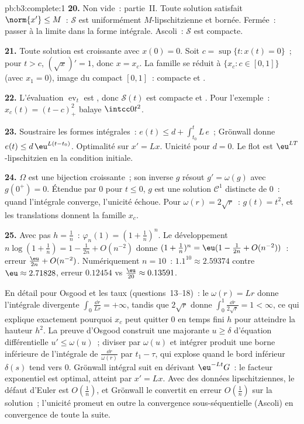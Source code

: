\begin{solution}{pb:b3:complete:1}
\textbf{20.} Non vide~: partie~II. Toute solution satisfait
$\norm{x'} \leq M$~: $\mathcal S$ est uniformément
$M$-lipschitzienne et bornée. Fermée~: passer à la limite
dans la forme intégrale. Ascoli~: $\mathcal S$ est compacte.

\textbf{21.} Toute solution est croissante avec $x(0) = 0$.
Soit $c = \sup\{t : x(t) = 0\}$~; pour $t > c$, $(\sqrt x)' =
1$, donc $x = x_c$. La famille se réduit à $\{x_c : c \in
[0,1]\}$ (avec $x_1 = 0$), image  du compact 
$[0,1]$~: compacte et .

\textbf{22.} L'évaluation $\operatorname{ev}_t$ est ,
donc $\mathcal S(t)$ est compacte et . Pour
l'exemple~: $x_c(t) = (t - c)_+^2$ balaye $\intcc0{t^2}$.

\textbf{23.} Soustraire les formes intégrales~: $e(t) \leq d
+ \int_{t_0}^t L\,e$~; Grönwall donne $e(t) \leq
d\,\eu^{L(t-t_0)}$. Optimalité sur $x' = Lx$. Unicité pour $d
= 0$. Le flot est $\eu^{LT}$-lipschitzien en la condition
initiale.

\textbf{24.} $\Omega$ est une bijection croissante~; son
inverse $g$ résout $g' = \omega(g)$ avec $g(0^+) = 0$.
Étendue par $0$ pour $t \leq 0$, $g$ est une solution
$\mathcal C^1$ distincte de $0$~: quand l'intégrale
converge, l'unicité échoue. Pour $\omega(r) = 2\sqrt r$~:
$g(t) = t^2$, et les translations donnent la famille $x_c$.

\textbf{25.} Avec pas $h = \frac1n$~: $\varphi_n(1) = (1 +
\frac1n)^n$. Le développement $n\log(1+\frac1n) = 1 -
\frac1{2n} + O(n^{-2})$ donne $(1+\frac1n)^n =
\eu(1-\frac1{2n}+O(n^{-2}))$~: erreur $\frac{\eu}{2n} +
O(n^{-2})$. Numériquement $n = 10$~: $1.1^{10} \approx
2.59374$ contre $\eu \approx 2.71828$, erreur $0.12454$ vs
$\frac{\eu}{20} \approx 0.13591$.


En détail pour Osgood et les taux (questions~13--18)~: le
 $\omega(r) = Lr$ donne l'intégrale divergente
$\int_0\frac{\dd r}{Lr} = +\infty$, tandis que $2\sqrt r$
donne $\int_0^1\frac{\dd r}{2\sqrt r} = 1 < \infty$, ce qui
explique exactement pourquoi $x_c$ peut quitter $0$ en temps
fini $h$ pour atteindre la hauteur $h^2$. La preuve d'Osgood
construit une majorante $u \geq \delta$ d'équation
différentielle $u' \leq \omega(u)$~; diviser par $\omega(u)$
et intégrer produit une borne inférieure de l'intégrale de
$\frac{\dd r}{\omega(r)}$ par $t_1 - \tau$, qui explose
quand le bord inférieur $\delta(s)$ tend vers $0$. Grönwall
intégral suit en dérivant $\eu^{-Lt}G$~: le facteur
exponentiel est optimal, atteint par $x' = Lx$. Avec des
données lipschitziennes, le défaut d'Euler est
$O(\frac1n)$, et Grönwall le convertit en erreur $O(\frac1n)$
sur la solution~; l'unicité promeut en outre la convergence
sous-séquentielle (Ascoli) en convergence de toute la suite.


\end{solution}
